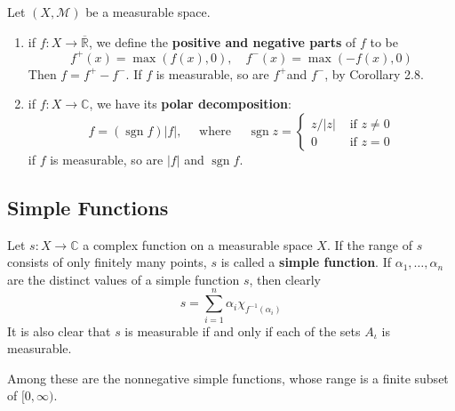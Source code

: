 \documentclass[12pt, a4paper, oneside]{book}
\begin{document}
\begin{definition}
    Let $\left(X,\mathcal{M}\right)$ be a measurable space.

    \begin{enumerate}
        \item
              if $f: X \rightarrow \overline{\mathbb{R}}$, we define the \textbf{positive and negative parts} of $f$ to be
              \begin{equation*}
                  f^{+}(x)=\max (f(x), 0), \quad f^{-}(x)=\max (-f(x), 0)
              \end{equation*}
              Then $f=f^{+}-f^{-}$. If $f$ is measurable, so are $f^{+}$and $f^{-}$, by Corollary 2.8.

        \item
              if $f: X \rightarrow \mathbb{C}$, we have its \textbf{polar decomposition}:
              \begin{equation*}
                  f=(\operatorname{sgn} f)|f|, \quad \text { where } \quad \operatorname{sgn} z= \begin{cases}z /|z| & \text { if } z \neq 0 \\ 0 & \text { if } z=0\end{cases}
              \end{equation*}
              if $f$ is measurable, so are $|f|$ and $\operatorname{sgn} f$.
    \end{enumerate}
\end{definition}



\subsection{Simple Functions} %
\begin{definition}
    Let $s:X\longrightarrow \mathbb{C}$ a complex function  on a measurable space $X$.
    If the range of $s$ consists of only finitely many points, $s$ is called a \textbf{simple function}.
    If $\alpha_1, \ldots, \alpha_n$ are the distinct values of a simple function $s$,
    then clearly
    \begin{equation*}
        s=\sum_{i=1}^{n}\alpha_{i}\chi_{f^{-1}\left(\alpha_i\right)}
    \end{equation*}
    It is also clear that $s$ is measurable if and only if each of the sets $A_{\iota}$ is measurable.

    Among these are the nonnegative simple functions, whose range is a finite subset of $[0,\infty).$
\end{definition}
\end{document}
